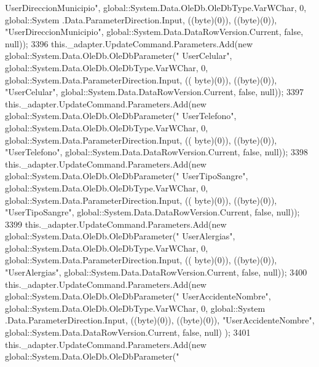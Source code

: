 \begin{DoxyCode}
{      UserDireccionMunicipio"}, global::System.Data.OleDb.OleDbType.VarWChar, 0, global::System
      .Data.ParameterDirection.Input, ((byte)(0)), ((byte)(0)), \textcolor{stringliteral}{"UserDireccionMunicipio"}, global::System.Data.DataRowVersion.Current, \textcolor{keyword}{false},
       null));
3396             this.\_adapter.UpdateCommand.Parameters.Add(\textcolor{keyword}{new} global::System.Data.OleDb.OleDbParameter(\textcolor{stringliteral}{"
      UserCelular"}, global::System.Data.OleDb.OleDbType.VarWChar, 0, global::System.Data.ParameterDirection.Input, ((
      byte)(0)), ((byte)(0)), \textcolor{stringliteral}{"UserCelular"}, global::System.Data.DataRowVersion.Current, \textcolor{keyword}{false}, null));
3397             this.\_adapter.UpdateCommand.Parameters.Add(\textcolor{keyword}{new} global::System.Data.OleDb.OleDbParameter(\textcolor{stringliteral}{"
      UserTelefono"}, global::System.Data.OleDb.OleDbType.VarWChar, 0, global::System.Data.ParameterDirection.Input, ((
      byte)(0)), ((byte)(0)), \textcolor{stringliteral}{"UserTelefono"}, global::System.Data.DataRowVersion.Current, \textcolor{keyword}{false}, null));
3398             this.\_adapter.UpdateCommand.Parameters.Add(\textcolor{keyword}{new} global::System.Data.OleDb.OleDbParameter(\textcolor{stringliteral}{"
      UserTipoSangre"}, global::System.Data.OleDb.OleDbType.VarWChar, 0, global::System.Data.ParameterDirection.Input, ((
      byte)(0)), ((byte)(0)), \textcolor{stringliteral}{"UserTipoSangre"}, global::System.Data.DataRowVersion.Current, \textcolor{keyword}{false}, null));
3399             this.\_adapter.UpdateCommand.Parameters.Add(\textcolor{keyword}{new} global::System.Data.OleDb.OleDbParameter(\textcolor{stringliteral}{"
      UserAlergias"}, global::System.Data.OleDb.OleDbType.VarWChar, 0, global::System.Data.ParameterDirection.Input, ((
      byte)(0)), ((byte)(0)), \textcolor{stringliteral}{"UserAlergias"}, global::System.Data.DataRowVersion.Current, \textcolor{keyword}{false}, null));
3400             this.\_adapter.UpdateCommand.Parameters.Add(\textcolor{keyword}{new} global::System.Data.OleDb.OleDbParameter(\textcolor{stringliteral}{"
      UserAccidenteNombre"}, global::System.Data.OleDb.OleDbType.VarWChar, 0, global::System
      .Data.ParameterDirection.Input, ((byte)(0)), ((byte)(0)), \textcolor{stringliteral}{"UserAccidenteNombre"}, global::System.Data.DataRowVersion.Current, \textcolor{keyword}{false}, null)
      );
3401             this.\_adapter.UpdateCommand.Parameters.Add(\textcolor{keyword}{new} global::System.Data.OleDb.OleDbParameter(\textcolor{stringliteral}{"
}
\end{DoxyCode}
